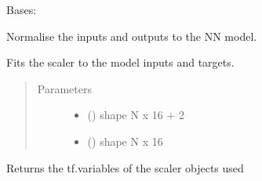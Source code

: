 \documentclass[letterpaper,10pt,english,openany,oneside]{sphinxmanual}
\begin{document}
\begin{fulllineitems}
\label{\detokenize{_modules/utils:utils.ModelScaler.ModelScaler}}
Bases: 

Normalise the inputs and outputs to the NN model.

\begin{fulllineitems}
\label{\detokenize{_modules/utils:utils.ModelScaler.ModelScaler.fit}}
Fits the scaler to the model inputs and targets.
\begin{quote}\begin{description}
\item[{Parameters}] \leavevmode\begin{itemize}
\item {} 
 () \textendash{} shape N x 16 + 2

\item {} 
 () \textendash{} shape N x 16

\end{itemize}

\end{description}\end{quote}

\end{fulllineitems}


\begin{fulllineitems}
\label{\detokenize{_modules/utils:utils.ModelScaler.ModelScaler.get_vars}}
Returns the tf.variables of the scaler objects used


\end{fulllineitems}
\end{fulllineitems}
\end{document}
